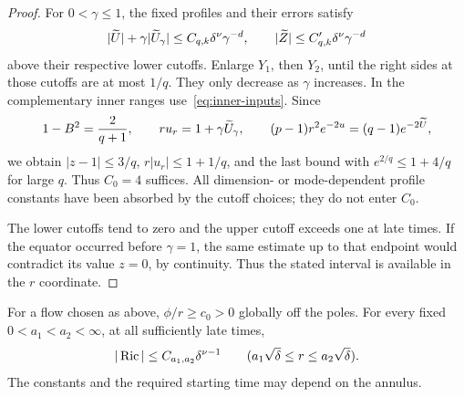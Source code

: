 \begin{proof}
For \(0<\gamma\le1\), the fixed profiles and their errors satisfy
\[
|\widetilde U|+\gamma|\widetilde U_\gamma|
\le C_{q,k}\delta^\nu\gamma^{-d},\qquad
|\widetilde Z|\le C'_{q,k}\delta^\nu\gamma^{-d}
\]
above their respective lower cutoffs. Enlarge \(Y_1\), then \(Y_2\), until
the right sides at those cutoffs are at most \(1/q\).
They only decrease as \(\gamma\) increases. In the complementary inner
ranges use~\eqref{eq:inner-inputs}. Since
\[
1-B^2=\frac{2}{q+1},\qquad
ru_r=1+\gamma\widetilde U_\gamma,\qquad
(p-1)r^2e^{-2u}=(q-1)e^{-2\widetilde U},
\]
we obtain \(|z-1|\le3/q\), \(r|u_r|\le1+1/q\), and the last bound with
\(e^{2/q}\le1+4/q\) for large \(q\). Thus \(C_0=4\) suffices.
All dimension- or mode-dependent profile constants have been absorbed by
the cutoff choices; they do not enter \(C_0\).

The lower cutoffs tend to zero and the upper cutoff exceeds one at late
times. If the equator occurred before \(\gamma=1\), the same estimate up
to that endpoint would contradict its value \(z=0\), by continuity.
Thus the stated interval is available in the \(r\) coordinate.
\end{proof}

\begin{lemma}\label{lem:annuli}
For a flow chosen as above, \(\phi/r\ge c_0>0\) globally off the poles.
For every fixed \(0<a_1<a_2<\infty\), at all sufficiently late times,
\begin{equation}\label{eq:annular-ricci}
|\operatorname{Ric}|\le C_{a_1,a_2}\delta^{\nu-1}
\qquad(a_1\sqrt\delta\le r\le a_2\sqrt\delta).
\end{equation}
The constants and the required starting time may depend on the annulus.
\end{lemma}

